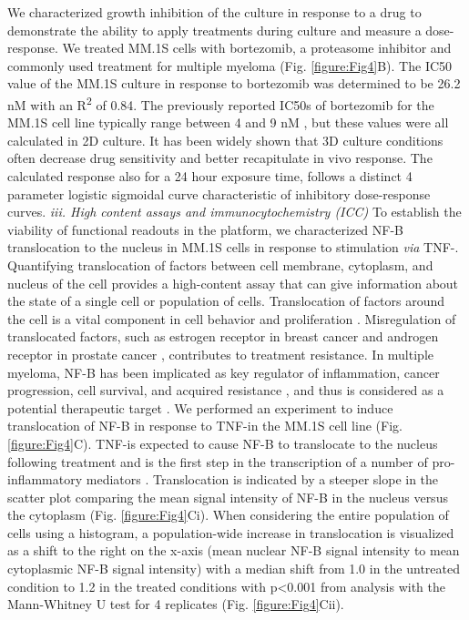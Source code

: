 We characterized growth inhibition of the culture in response to a drug to demonstrate the ability to apply treatments during culture and measure a dose-response. We treated MM.1S cells with bortezomib, a proteasome inhibitor and commonly used treatment for multiple myeloma (Fig. \ref{figure:Fig4}B). The IC50 value of the MM.1S culture in response to bortezomib was determined to be 26.2 nM with an R\textsuperscript{2} of 0.84. The previously reported IC50s of bortezomib for the MM.1S cell line typically range between 4 and 9 nM \cite{Bianchi2006, Hu2014, Horton2006}, but these values were all calculated in 2D culture. It has been widely shown that 3D culture conditions often decrease drug sensitivity \cite{Tung2011, Friedrich2009}and better recapitulate in vivo response. The calculated response also for a 24 hour exposure time, follows a distinct 4 parameter logistic sigmoidal curve characteristic of inhibitory dose-response curves. 
\newline
\textit{iii. High content assays and immunocytochemistry (ICC)} To establish the viability of functional readouts in the platform, we characterized NF-\textkappa B translocation to the nucleus in MM.1S cells in response to stimulation \textit{via} TNF-\textalpha. Quantifying translocation of factors between cell membrane, cytoplasm, and nucleus of the cell provides a high-content assay that can give information about the state of a single cell or population of cells. Translocation of factors around the cell is a vital component in cell behavior and proliferation \cite{Chuderland2008}. Misregulation of translocated factors, such as estrogen receptor in breast cancer \cite{Revankar2005} and androgen receptor in prostate cancer \cite{Molina2011}, contributes to treatment resistance. In multiple myeloma, NF-\textkappa B has been implicated as key regulator of inflammation, cancer progression, cell survival, and acquired resistance \cite{hideshima2000thalidomide}, and thus is considered as a potential therapeutic target \cite{Hideshima2001TheApplications}. 
We performed an experiment to induce translocation of NF-\textkappa B in response to TNF-\textalpha  in the MM.1S cell line (Fig. \ref{figure:Fig4}C). TNF-\textalpha  is expected to cause NF-\textkappa B to translocate to the nucleus following treatment and is the first step in the transcription of a number of pro-inflammatory mediators \cite{Pahl1999}. Translocation is indicated by a steeper slope in the scatter plot comparing the mean signal intensity of NF-\textkappa B in the nucleus versus the cytoplasm (Fig. \ref{figure:Fig4}Ci). When considering the entire population of cells using a histogram, a population-wide increase in translocation is visualized as a shift to the right on the x-axis (mean nuclear NF-\textkappa B signal intensity to mean cytoplasmic NF-\textkappa B signal intensity) with a median shift from 1.0 in the untreated condition to 1.2 in the treated conditions with p<0.001 from analysis with the Mann-Whitney U test for 4 replicates (Fig. \ref{figure:Fig4}Cii).

